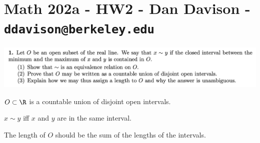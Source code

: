 \section*{Math 202a - HW2 - Dan Davison - \texttt{ddavison@berkeley.edu}}

\begin{mdframed}
  \includegraphics[width=400pt]{img/analysis--berkeley-202a-ebe4.png}
\end{mdframed}

\begin{intuition*}
  $O \subset \R$ is a countable union of disjoint open intervals.

  $x \sim y$ iff $x$ and $y$ are in the same interval.

  The length of $O$ should be the sum of the lengths of the intervals.
\end{intuition*}


